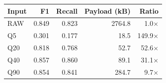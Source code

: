 \begin{tabular}{lrrrr}
\hline
Input & F1 & Recall & Payload (kB) & Ratio \\
\hline
RAW & 0.849 & 0.823 & 2764.8 & 1.0$\times$ \\
Q5 & 0.301 & 0.177 & 18.5 & 149.9$\times$ \\
Q20 & 0.818 & 0.768 & 52.7 & 52.6$\times$ \\
Q40 & 0.857 & 0.860 & 89.1 & 31.1$\times$ \\
Q90 & 0.854 & 0.841 & 284.7 & 9.7$\times$ \\
\hline
\end{tabular}
